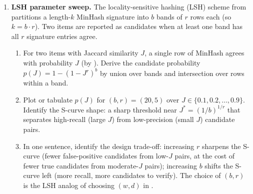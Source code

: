 \begin{enumerate}
\item \exstarstarstar
\label{ex:ch10-11}
\textbf{LSH parameter sweep.}
The locality-sensitive hashing (LSH) scheme from
 partitions a length-$k$ MinHash signature
into $b$ bands of $r$ rows each (so $k = b \cdot r$). Two items
are reported as candidates when at least one band has all $r$
signature entries agree.
\begin{enumerate}
  \item[(a)] For two items with Jaccard similarity $J$, a single
    row of MinHash agrees with probability $J$ (by
    ). Derive the candidate
    probability $p(J) = 1 - (1 - J^r)^b$ by union over bands and
    intersection over rows within a band.
  \item[(b)] Plot or tabulate $p(J)$ for $(b, r) = (20, 5)$ over
    $J \in \{0.1, 0.2, \ldots, 0.9\}$. Identify the S-curve
    shape: a sharp threshold near $J^* = (1 / b)^{1 / r}$ that
    separates high-recall (large $J$) from low-precision (small
    $J$) candidate pairs.
  \item[(c)] In one sentence, identify the design trade-off:
    increasing $r$ sharpens the S-curve (fewer false-positive
    candidates from low-$J$ pairs, at the cost of fewer true
    candidates from moderate-$J$ pairs); increasing $b$ shifts
    the S-curve left (more recall, more candidates to verify).
    The choice of $(b, r)$ is the LSH analog of choosing
    $(w, d)$ in .
\end{enumerate}

\end{enumerate}
